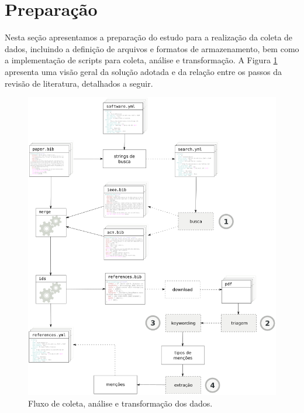 
\section{Preparação} \label{estudo2:preparacao} %

Nesta seção apresentamos a preparação do estudo para a realização da coleta de
dados, incluindo a definição de arquivos e formatos de armazenamento, bem como
a implementação de scripts para coleta, análise e transformação.
A Figura \ref{estudo2-fluxograma} apresenta uma visão geral da solução adotada
e da relação entre os passos da revisão de literatura, detalhados a seguir.

\begin{figure}[h]
  \center
  \includegraphics[scale=0.35]{imagens/estudo2-fluxograma.png}
  \caption{Fluxo de coleta, análise e transformação dos dados.}
  \label{estudo2-fluxograma}
\end{figure}


